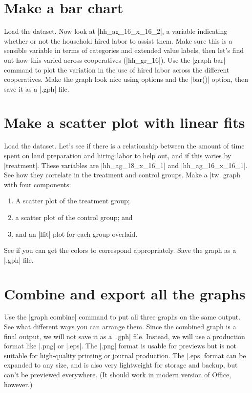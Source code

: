 \documentclass{tufte-handout}
\begin{document}
\section{Make a bar chart}

Load the dataset. Now look at |hh_ag_16_x_16_2|,
a variable indicating whether or not the household hired labor to assist them.
Make sure this is a sensible variable in terms of categories
and extended value labels, then let’s find
out how this varied across cooperatives (|hh_gr_16|).
Use the |graph bar| command to plot the variation in the use of hired labor
across the different cooperatives.
Make the graph look nice using options and the |bar()| option,
then save it as a |.gph| file.

\section{Make a scatter plot with linear fits}

Load the dataset. Let’s see if there is a relationship between
the amount of time spent on land preparation and
hiring labor to help out, and if this varies by |treatment|.
These variables are |hh_ag_18_x_16_1| and |hh_ag_16_x_16_1|.
See how they correlate in the treatment and control groups.
Make a |tw| graph with four components:
\begin{enumerate}
  \item A scatter plot of the treatment group;
  \item a scatter plot of the control group; and
  \item and an |lfit| plot for each group overlaid.
\end{enumerate}
See if you can get the colors to correspond appropriately.
Save the graph as a |.gph| file.

\section{Combine and export all the graphs}

Use the |graph combine| command to put all three graphs on the same output.
See what different ways you can arrange them.
Since the combined graph is a final output, we will not save it as a |.gph| file.
Instead, we will use a production format like |.png| or |.eps|.
The |.png| format is usable for previews but is not suitable
for high-quality printing or journal production.
The |.eps| format can be expanded to any size,
and is also very lightweight for storage and backup,
but can't be previewed everywhere.
(It should work in modern version of Office, however.)
\end{document}

